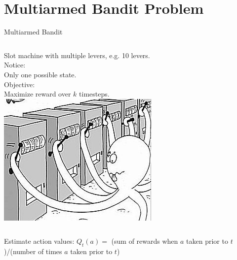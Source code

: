 \documentclass{beamer}
\begin{document}

\section{Multiarmed Bandit Problem}

\begin{frame}{Multiarmed Bandit}
	\begin{columns}
	Slot machine with multiple levers, e.g. 10 levers. \\
	\vspace{0.5cm}
	Notice:\\
	\hspace{1cm}Only one possible state.\\
	Objective:\\
	\hspace{1cm}Maximize reward over $k$ timesteps.
	\includegraphics[width=\linewidth]{Images/multiarmedbandit.jpg}\\	
	\end{columns}
	\begin{block}{Estimate action values:}
		$Q_t(a) = $ (sum of rewards when $a$ taken prior to $t$)/(number of times $a$ taken prior to $t$)
	\end{block}
\end{frame}
\end{document}
